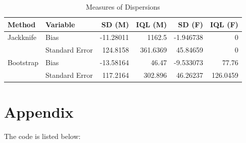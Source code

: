 \documentclass{article}
\begin{document}
\begin{table}[ht!]
\begin{center}
\begin{tabular}{|l|l|r|r|r|r|}
                                                  \hline
Method     & Variable        &  SD (M)   & IQL (M)  & SD (F)    & IQL (F) \\ \hline
Jackknife  & Bias            & -11.28011 &   1162.5 & -1.946738 & 0 \\ 
           & Standard Error  &  124.8158 & 361.6369 &  45.84659 & 0 \\ \hline
Bootstrap  & Bias            & -13.58164 &    46.47 & -9.533073 & 77.76 \\
           & Standard Error  &  117.2164 &  302.896 &  46.26237 & 126.0459 \\ \hline
    \end{tabular}
  \end{center}
  \caption{Measures of Dispersions \label{tab:bv}}
\end{table}

\section{Appendix}
The code is listed below:


 
\end{document}
